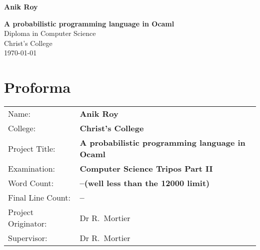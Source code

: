 \documentclass[12pt,twoside,notitlepage,a4paper]{report}
\begin{document}





\pagestyle{empty}

\hfill{\LARGE \bf Anik Roy}

\vspace*{60mm}
\begin{center}
\Huge
{\bf A probabilistic programming language in Ocaml} \\
\vspace*{5mm}
Diploma in Computer Science \\
\vspace*{5mm}
Christ's College \\
\vspace*{5mm}
\today  %
\end{center}

\cleardoublepage


\setcounter{page}{1}
\pagestyle{plain}

\chapter*{Proforma}

{\large
\begin{tabular}{ll}
Name:               & \bf Anik Roy                       \\
College:            & \bf Christ's College                     \\
Project Title:      & \bf A probabilistic programming language in Ocaml \\
Examination:        & \bf Computer Science Tripos Part II        \\
Word Count:         & \bf --\footnotemark[1] (well less than the 12000 limit) \\
Final Line Count:         & \bf --\footnotemark[2] \\
Project Originator: & Dr R.~Mortier                    \\
Supervisor:         & Dr R.~Mortier                    \\ 
\end{tabular}
}
\end{document}
